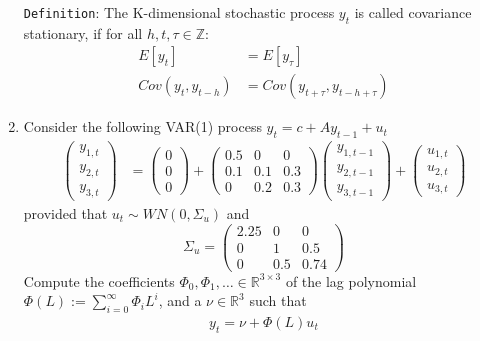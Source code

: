 \begin{enumerate}
\begin{solution}
              \texttt{Definition}: The K-dimensional stochastic process $y_t$ is called covariance stationary, if for all $h,t,\tau \in \mathbb{Z}$:
              \begin{align}
                  E[{y_t}]           & = E[{y_\tau}]                                  \\
                  Cov(y_{t},y_{t-h}) & = Cov(y_{t+\tau}, y_{t-h+\tau}) \label{gammas}
              \end{align}
          \end{solution}
    \item Consider the following VAR(1) process $y_t = c + A y_{t-1} + u_t$
          \begin{align*}
              \begin{pmatrix}y_{1,t} \\ y_{2,t}\\y_{3,t} \end{pmatrix} & = \begin{pmatrix}0\\0\\0 \end{pmatrix} + \begin{pmatrix}0.5 &0 &0 \\0.1&0.1&0.3\\0&0.2&0.3 \end{pmatrix} \begin{pmatrix}y_{1,{t-1}} \\ y_{2,{t-1}}\\y_{3,{t-1}} \end{pmatrix} + \begin{pmatrix}u_{1,t} \\ u_{2,t}\\ u_{3,t} \end{pmatrix}
          \end{align*}
          provided that $u_t \sim WN(0,\Sigma_u)$ and $$\Sigma_u = \begin{pmatrix}2.25 & 0 & 0\\ 0 & 1 & 0.5\\ 0 & 0.5 & 0.74 \end{pmatrix}$$
          Compute the coefficients $\Phi_0, \Phi_1, \dots \in \mathbb{R}^{3\times 3}$ of the lag polynomial $\Phi(L) := \sum_{i=0}^\infty \Phi_i L^i$, and a $\nu \in \mathbb{R}^3$ such that
          \begin{align*}
              y_t = \nu + \Phi(L) u_t
          \end{align*}
          \begin{solution}

\end{solution}
\end{enumerate}
